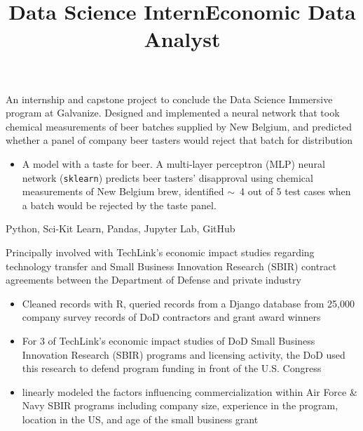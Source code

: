 \documentclass[resmargin, centered, 10pt]{res}
\begin{document}
\begin{resume}
\title{Data Science Intern}
\begin{position}
	An internship and capstone project to conclude the Data Science Immersive program at Galvanize. Designed and implemented a neural network that took chemical measurements of beer batches supplied by New Belgium, and predicted whether a panel of company beer tasters would reject that batch for distribution

	\begin{itemize}
		\item {} A model with a taste for beer. A multi-layer perceptron (MLP) neural network (\texttt{sklearn}) predicts beer tasters’ disapproval using chemical measurements of New Belgium brew, identified $\sim$\hspace{-1mm}~4 out of 5 test cases when a batch would be rejected by the taste panel.
	\end{itemize}

	 Python, Sci-Kit Learn, Pandas, Jupyter Lab, GitHub
\end{position}

\title{Economic Data Analyst}
\begin{position}
Principally involved with TechLink's economic impact studies regarding technology transfer and Small Business Innovation Research (SBIR) contract agreements between the Department of Defense and private industry

	\begin{itemize}
		\item {} Cleaned records with R, queried records from a Django database from 25,000 company survey records of DoD contractors and grant award winners
		\item {} For 3 of TechLink’s economic impact studies of DoD Small Business Innovation Research (SBIR) programs and licensing activity, the DoD used this research to defend program funding in front of the U.S. Congress
		\item {} linearly modeled the factors influencing commercialization within Air Force \& Navy SBIR programs including company size, experience in the program, location in the US, and age of the small business grant
	\end{itemize}


\end{position}
\end{resume}
\end{document}
